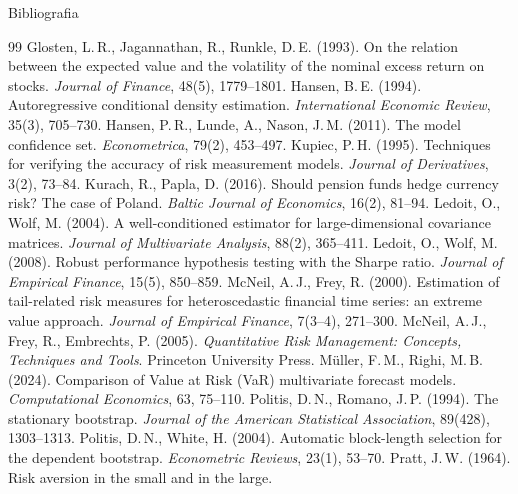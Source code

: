 \documentclass[aspectratio=169,11pt]{beamer}
\begin{document}
\begin{frame}[allowframebreaks]{Bibliografia}
\begin{thebibliography}{99}
      Glosten, L.\,R., Jagannathan, R., Runkle, D.\,E. (1993). On the relation
      between the expected value and the volatility of the nominal excess
      return on stocks. \emph{Journal of Finance}, 48(5), 1779--1801.
      Hansen, B.\,E. (1994). Autoregressive conditional density estimation.
      \emph{International Economic Review}, 35(3), 705--730.
      Hansen, P.\,R., Lunde, A., Nason, J.\,M. (2011). The model confidence
      set. \emph{Econometrica}, 79(2), 453--497.
      Kupiec, P.\,H. (1995). Techniques for verifying the accuracy of risk
      measurement models. \emph{Journal of Derivatives}, 3(2), 73--84.
      Kurach, R., Papla, D. (2016). Should pension funds hedge currency risk?
      The case of Poland. \emph{Baltic Journal of Economics}, 16(2), 81--94.
      Ledoit, O., Wolf, M. (2004). A well-conditioned estimator for
      large-dimensional covariance matrices. \emph{Journal of Multivariate
      Analysis}, 88(2), 365--411.
      Ledoit, O., Wolf, M. (2008). Robust performance hypothesis testing with
      the Sharpe ratio. \emph{Journal of Empirical Finance}, 15(5), 850--859.
      McNeil, A.\,J., Frey, R. (2000). Estimation of tail-related risk
      measures for heteroscedastic financial time series: an extreme value
      approach. \emph{Journal of Empirical Finance}, 7(3--4), 271--300.
      McNeil, A.\,J., Frey, R., Embrechts, P. (2005). \emph{Quantitative Risk
      Management: Concepts, Techniques and Tools}. Princeton University Press.
      Müller, F.\,M., Righi, M.\,B. (2024). Comparison of Value at Risk (VaR)
      multivariate forecast models. \emph{Computational Economics}, 63,
      75--110.
      Politis, D.\,N., Romano, J.\,P. (1994). The stationary bootstrap.
      \emph{Journal of the American Statistical Association}, 89(428),
      1303--1313.
      Politis, D.\,N., White, H. (2004). Automatic block-length selection for
      the dependent bootstrap. \emph{Econometric Reviews}, 23(1), 53--70.
      Pratt, J.\,W. (1964). Risk aversion in the small and in the large.

\end{thebibliography}
\end{frame}
\end{document}
